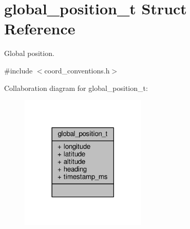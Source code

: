 \hypertarget{structglobal__position__t}{\section{global\+\_\+position\+\_\+t Struct Reference}
\label{structglobal__position__t}
}


Global position.  




{\ttfamily \#include $<$coord\+\_\+conventions.\+h$>$}



Collaboration diagram for global\+\_\+position\+\_\+t\+:
\nopagebreak
\begin{figure}[H]
\begin{center}
\leavevmode
\includegraphics[width=170pt]{structglobal__position__t__coll__graph}
\end{center}
\end{figure}
